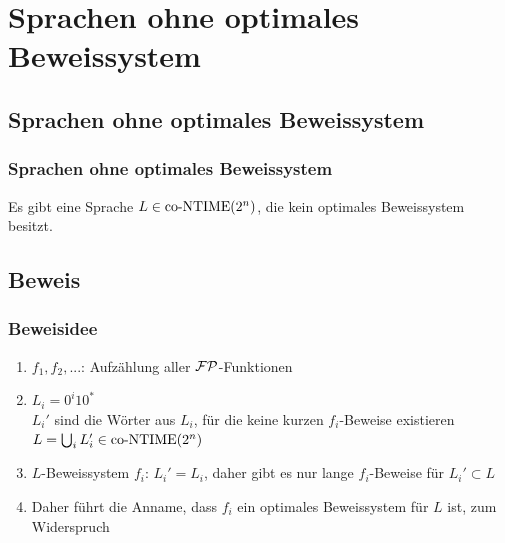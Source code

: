 \section{Sprachen ohne optimales Beweissystem} 
\subsection{Sprachen ohne optimales Beweissystem}

\begin{frame}
  \frametitle{Sprachen ohne optimales Beweissystem}
  
  \begin{theorem}
    Es gibt eine Sprache \(L \in \text{co-NTIME}(2^n)\), die kein optimales Beweissystem besitzt.
  \end{theorem}
\end{frame}

\subsection{Beweis}

\begin{frame}
  \frametitle{Beweisidee}

  \begin{enumerate}
   \item<1-> \(f_1, f_2, ...\): Aufzählung aller \(\mathcal{FP}\)-Funktionen
   \item<2-> \(L_i = 0^i10^*\) \\
               \(L_i'\) sind die Wörter aus \(L_i\), für die keine kurzen \(f_i\)-Beweise existieren \\
               \(L = \bigcup_i L_i' \in \text{co-NTIME}(2^n)\)
   \item<5-> \(L\)-Beweissystem \(f_i\): \(L_i' = L_i\), daher gibt es nur lange \(f_i\)-Beweise für \(L_i' \subset L\)
   \item<6-> Daher führt die Anname, dass \(f_i\) ein optimales Beweissystem für \(L\) ist, zum Widerspruch
  \end{enumerate}
\end{frame}

